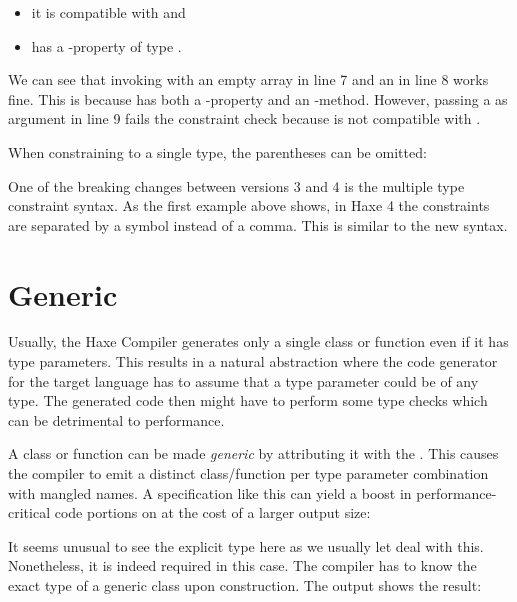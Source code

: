 \begin{itemize}
	\item it is compatible with  and
	\item has a -property of type .
\end{itemize}
We can see that invoking  with an empty array in line 7 and an  in line 8 works fine. This is because  has both a -property and an -method. However, passing a  as argument in line 9 fails the constraint check because  is not compatible with . 

When constraining to a single type, the parentheses can be omitted:



One of the breaking changes between versions 3 and 4 is the multiple type constraint syntax. As the first example above shows, in Haxe 4 the constraints are separated by a \expr{\&} symbol instead of a comma. This is similar to the new  syntax.


\section{Generic}
\label{type-system-generic}

Usually, the Haxe Compiler generates only a single class or function even if it has type parameters. This results in a natural abstraction where the code generator for the target language has to assume that a type parameter could be of any type. The generated code then might have to perform some type checks which can be detrimental to performance.

A class or function can be made \emph{generic} by attributing it with the  . This causes the compiler to emit a distinct class/function per type parameter combination with mangled names. A specification like this can yield a boost in performance-critical code portions on  at the cost of a larger output size:


It seems unusual to see the explicit type  here as we usually let  deal with this. Nonetheless, it is indeed required in this case. The compiler has to know the exact type of a generic class upon construction. The  output shows the result:

